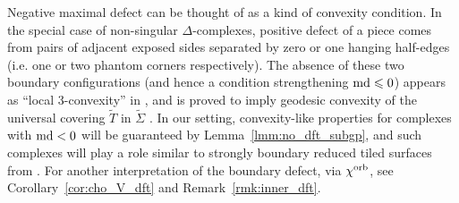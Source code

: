 \documentclass{amsart}
\newcommand{\cho}{\chi^{\textnormal{orb}}}
\newcommand{\md}{\textnormal{md}}
\begin{document}
Negative maximal defect can be thought of as a kind of convexity condition. In the special case of non-singular $\Delta$-complexes, positive defect of a piece comes from pairs of adjacent exposed sides separated by zero or one hanging half-edges (i.e. one or two phantom corners respectively). The absence of these two boundary configurations (and hence a condition strengthening $\md\leqslant0$) appears as ``local 3-convexity'' in \cite[Definition 5.1]{combi_nonpositive_curvature_weak_systolicity_Osajda13}, and is proved to imply geodesic convexity of the universal covering $\widetilde{T}$ in $\widetilde\Sigma$ \cite[Lemma 5.2]{combi_nonpositive_curvature_weak_systolicity_Osajda13}. In our setting, convexity-like properties for complexes with $\md<0$ will be guaranteed by Lemma~\ref{lmm:no_dft_subgp}, and such complexes will play a role similar to strongly boundary reduced tiled surfaces from \cite[Definition 2.5]{asymptotic_stats_random_covering_surfaces_MageePuder23}. For another interpretation of the boundary defect, via $\cho$, see Corollary~\ref{cor:cho_V_dft} and Remark~\ref{rmk:inner_dft}.

\medskip
\end{document}
